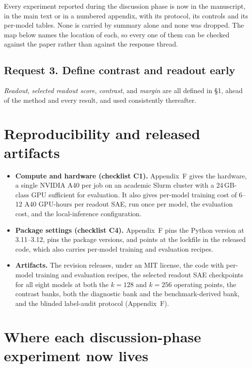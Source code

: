 \documentclass[11pt]{article}
\begin{document}
Every experiment reported during the discussion phase is now in the
manuscript, in the main text or in a numbered appendix, with its protocol,
its controls and its per-model tables. None is carried by summary alone and
none was dropped. The map below names the location of each, so every
one of them can be checked against the paper rather than against the response
thread.

\subsection*{Request 3. Define contrast and readout early}

\emph{Readout}, \emph{selected readout score}, \emph{contrast}, and
\emph{margin} are all defined in \S1, ahead of the method and every result, and
used consistently thereafter.

\section{Reproducibility and released artifacts}

\begin{itemize}
\item \textbf{Compute and hardware (checklist C1).} Appendix~F gives the
hardware, a single NVIDIA A40 per job on an academic Slurm cluster with a
24\,GB-class GPU sufficient for evaluation. It also gives per-model training
cost of 6--12 A40 GPU-hours per readout SAE, run once per model, the
evaluation cost, and the local-inference configuration.
\item \textbf{Package settings (checklist C4).} Appendix~F pins the Python
version at 3.11--3.12, pins the package versions, and points at the lockfile
in the released code, which also carries per-model training and evaluation
recipes.
\item \textbf{Artifacts.} The revision releases, under an MIT license, the
code with per-model training and evaluation recipes, the selected readout SAE
checkpoints for all eight models at both the $k{=}128$ and $k{=}256$
operating points, the contrast banks, both the diagnostic bank and the
benchmark-derived bank, and the blinded label-audit protocol (Appendix~F).
\end{itemize}

\section{Where each discussion-phase experiment now lives}
\label{sec:map}
\end{document}
